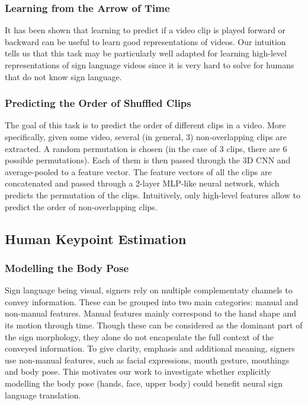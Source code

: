 \documentclass[final]{cvpr}
\begin{document}
\subsubsection{Learning from the Arrow of Time}
It has been shown \cite{arrow} that learning to predict if a video clip is played forward or backward can be useful to learn good representations of videos. Our intuition tells us that this task may be particularly well adapted for learning high-level representations of sign language videos since it is very hard to solve for humans that do not know sign language.

\subsubsection{Predicting the Order of Shuffled Clips}
The goal of this task is to predict the order of different clips in a video. More specifically, given some video, several (in general, 3) non-overlapping clips are extracted. A random permutation is chosen (in the case of 3 clips, there are 6 possible permutations). Each of them is then passed through the 3D CNN and average-pooled to a feature vector. The feature vectors of all the clips are concatenated and passed through a 2-layer MLP-like neural network, which predicts the permutation of the clips. Intuitively, only high-level features allow to predict the order of non-overlapping clips.
\subsection{Human Keypoint Estimation}
\subsubsection{Modelling the Body Pose}
Sign language being visual, signers rely on multiple complementaty channels to convey information. These can be grouped into two main categories: manual and non-manual features. Manual features mainly correspond to the hand shape and its motion through time. Though these can be considered as the dominant part of the sign morphology, they alone do not encapsulate the full context of the conveyed information. To give clarity, emphasis and additional meaning, signers use non-manual features, such as facial expressions, mouth gesture, mouthings and body pose. This motivates our work to investigate whether explicitly modelling the body pose (hands, face, upper body) could benefit neural sign language translation.
\end{document}
